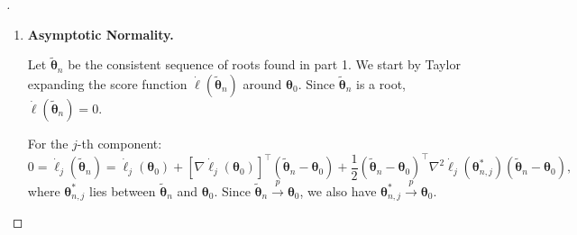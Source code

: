 \begin{proof}[]
\begin{enumerate}
\begin{proof}[of Claim \ref{claim:local_max}]
\begin{enumerate}
        \item \textbf{Remainder Term ($R_n$):}
        Using the bound on third derivatives $M_{jkl}(x)$ from assumption A3:
        \[ |R_n| \le \frac{1}{6} \sum_{j,k,l} |\theta_j - \theta_{0j}| |\theta_k - \theta_{0k}| |\theta_l - \theta_{0l}| \left( \frac{1}{n} \sum_{i=1}^n M_{jkl}(X_i) \right). \]
        Since $\|\boldsymbol{\theta} - \boldsymbol{\theta}_0\| = a$, the product of differences scales with $a^3$. By the LLN, $\frac{1}{n} \sum M_{jkl}(X_i) \stackrel{p}{\longrightarrow} \mathsf{E}[M_{jkl}(X_1)]$.
        Thus, with high probability:
        \[ |R_n| \le B a^3 \quad (\text{where } B > 0 \text{ is a constant}). \]
    \end{enumerate}

    Combining these terms, on the sphere $Q_a$:
    \[ \frac{1}{n} [\ell(\boldsymbol{\theta}) - \ell(\boldsymbol{\theta}_0)] \le \frac{1}{2}a^3 - C a^2 + B a^3 = a^2 ( (B + 1/2)a - C ). \]
    For sufficiently small $a$ (specifically $a < \frac{C}{B + 1/2}$), the negative quadratic term $-C a^2$ dominates the cubic terms. Thus, the expression is strictly negative.
    
    This proves that $\ell(\boldsymbol{\theta}) < \ell(\boldsymbol{\theta}_0)$ for all $\boldsymbol{\theta} \in Q_a$ with probability approaching 1.
    \end{proof}

    \item \textbf{Asymptotic Normality.}
    
    Let $\tilde{\boldsymbol{\theta}}_n$ be the consistent sequence of roots found in part 1. We start by Taylor expanding the score function $\dot{\ell}(\tilde{\boldsymbol{\theta}}_n)$ around $\boldsymbol{\theta}_0$. Since $\tilde{\boldsymbol{\theta}}_n$ is a root, $\dot{\ell}(\tilde{\boldsymbol{\theta}}_n) = 0$.
    
    For the $j$-th component:
    \[
    0 = \dot{\ell}_j(\tilde{\boldsymbol{\theta}}_n) = \dot{\ell}_j(\boldsymbol{\theta}_0) + \left[ \nabla \dot{\ell}_j(\boldsymbol{\theta}_0) \right]^\top (\tilde{\boldsymbol{\theta}}_n - \boldsymbol{\theta}_0) + \frac{1}{2} (\tilde{\boldsymbol{\theta}}_n - \boldsymbol{\theta}_0)^\top \nabla^2 \dot{\ell}_j(\boldsymbol{\theta}_{n,j}^*) (\tilde{\boldsymbol{\theta}}_n - \boldsymbol{\theta}_0),
    \]
    where $\boldsymbol{\theta}_{n,j}^*$ lies between $\tilde{\boldsymbol{\theta}}_n$ and $\boldsymbol{\theta}_0$. Since $\tilde{\boldsymbol{\theta}}_n \stackrel{p}{\longrightarrow} \boldsymbol{\theta}_0$, we also have $\boldsymbol{\theta}_{n,j}^* \stackrel{p}{\longrightarrow} \boldsymbol{\theta}_0$.


\end{enumerate}
\end{proof}
